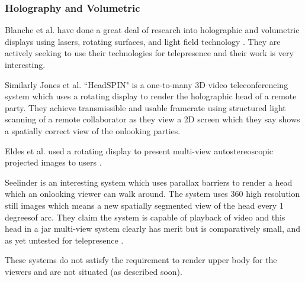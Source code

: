 \subsubsection{Holography and Volumetric}
Blanche et al. have done a great deal of research into holographic and volumetric displays using lasers, rotating surfaces, and light field technology   \cite{Blanche2010,tay2008updatable}. They are actively seeking to use their technologies for telepresence and their work is very interesting.\par
Similarly Jones et al. ``HeadSPIN" is a one-to-many 3D video teleconferencing system \cite{jones2009headspin} which uses a rotating display to render the holographic head of a remote party. They achieve transmissible and usable framerate using structured light scanning of a remote collaborator as they view a 2D screen which they say shows a spatially correct view of the onlooking parties.\par
Eldes et al. used a rotating display to present multi-view autostereoscopic projected images to users \cite{eldes2013multi}.\par
Seelinder is an interesting system which uses parallax barriers to render a head which an onlooking viewer can walk around. The system uses 360 high resolution still images which means a new spatially segmented view of the head every 1 degreesof arc. They claim the system is capable of playback of video and this head in a jar multi-view system clearly has merit but is comparatively small, and as yet untested for telepresence \cite{Yendo2010}.\par
These systems do not satisfy the requirement to render upper body for the viewers and are not situated (as described soon).\par

 
